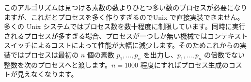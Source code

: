 このアルゴリズムは見つける素数の数よりひとつ多い数のプロセスが必要になりますが、これだとプロセスを多く作りすぎるのでUnix で直接実装できません。多くの Unix システムではプロセス数を数十程度に制限しています。同時に実行されるプロセスが多すぎる場合、プロセスが一つしか無い機械ではコンテキストスイッチによるコストによって性能が大幅に減少します。そのためこれからの実装ではプロセスは最初の $n$ 個の素数 $p_1, \ldots, p_n$ を出力し、$p_1, \ldots, p_n$ の倍数でない整数を次のプロセスへと渡します。$n=1000$ 程度にすればプロセス生成のコストが見えなくなります。



